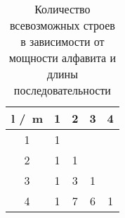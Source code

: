 \begin{table}[all_orders_count]
\centering
\caption{Количество всевозможных строев в зависимости от мощности алфавита и длины последовательности}
\label{}
\begin{tabular}{@{}|c|c|ccc@{}}
\toprule
\multicolumn{1}{|l|}{l /\ m} & \multicolumn{1}{l|}{1} & \multicolumn{1}{l|}{2} & \multicolumn{1}{l|}{3} & \multicolumn{1}{l|}{4} \\ \midrule
1                         & 1                      &                        &                        &                        \\ \cmidrule(r){1-3}
2                         & 1                      & \multicolumn{1}{c|}{1} &                        &                        \\ \cmidrule(r){1-4}
3                         & 1                      & \multicolumn{1}{c|}{3} & \multicolumn{1}{c|}{1} &                        \\ \midrule
4                         & 1                      & \multicolumn{1}{c|}{7} & \multicolumn{1}{c|}{6} & \multicolumn{1}{c|}{1} \\ \bottomrule
\end{tabular}
\end{table}
